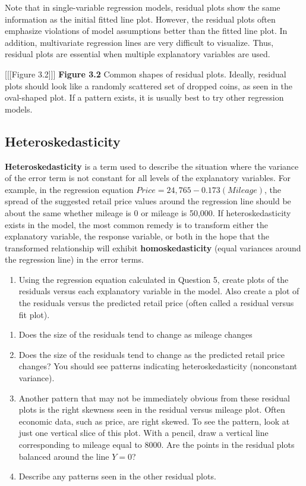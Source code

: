 \documentclass[
]{report}
\providecommand{\tightlist}{%
  \setlength{\itemsep}{0pt}\setlength{\parskip}{0pt}}
\begin{document}
Note that in single-variable regression models, residual plots show the same information as the initial fitted line plot. However, the residual plots often emphasize violations of model assumptions better than the fitted line plot. In addition, multivariate regression lines are very difficult to visualize. Thus, residual plots are essential
when multiple explanatory variables are used.

{[}{[}{[}Figure 3.2{]}{]}{]}
\textbf{Figure 3.2} Common shapes of residual plots. Ideally, residual plots should look like a randomly scattered set of dropped
coins, as seen in the oval-shaped plot. If a pattern exists, it is usually best to try other regression models.

\subsection*{Heteroskedasticity}\label{heteroskedasticity}

\textbf{Heteroskedasticity} is a term used to describe the situation where the variance of the error term is not constant for all levels of the explanatory variables. For example, in the regression equation \(Price = 24,765 - 0.173 (Mileage)\), the spread of the suggested retail price values around the regression line should be about the same whether mileage is 0 or mileage is 50,000. If heteroskedasticity exists in the model, the most common remedy is to transform either the explanatory variable, the response variable, or both in the hope that the transformed relationship will exhibit \textbf{homoskedasticity} (equal variances around the regression line) in the error terms.

\begin{enumerate}
\def\labelenumi{\arabic{enumi}.}
\setcounter{enumi}{6}
\tightlist
\item
  Using the regression equation calculated in Question 5, create plots of the residuals versus each explanatory variable in the model. Also create a plot of the residuals versus the predicted retail price (often called a residual versus fit plot).
\end{enumerate}

\begin{enumerate}
\def\labelenumi{\alph{enumi}.}
\item
  Does the size of the residuals tend to change as mileage changes
\item
  Does the size of the residuals tend to change as the predicted retail price changes? You should see patterns indicating heteroskedasticity (nonconstant variance).
\item
  Another pattern that may not be immediately obvious from these residual plots is the right skewness seen in the residual versus mileage plot. Often economic data, such as price, are right skewed. To see the pattern, look at just one vertical slice of this plot. With a pencil, draw a vertical line corresponding to mileage equal to 8000. Are the points in the residual plots balanced around the line \(Y = 0\)?
\item
  Describe any patterns seen in the other residual plots.
\end{enumerate}
\end{document}
